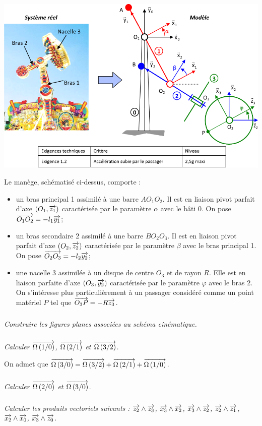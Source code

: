 \documentclass[10pt,oneside]{article}
\begin{document}
\begin{center}
\includegraphics[width=.9\textwidth]{png/img1}
\end{center}

Le manège, schématisé ci-dessus, comporte :
\begin{itemize}
\item un bras principal 1 assimilé à une barre $AO_1O_2$. Il est en liaison pivot parfait d'axe $(O_1,\overrightarrow{z_1})$ caractérisée par le paramètre $\alpha$ avec le bâti 0. On pose $\overrightarrow{O_1O_2}=-l_1\overrightarrow{y_1}$;
\item un bras secondaire 2 assimilé à une barre $BO_2O_3$. Il est en liaison pivot parfait d'axe $(O_2,\overrightarrow{z_2})$ caractérisée par le paramètre $\beta$ avec le bras principal 1. On pose $\overrightarrow{O_2O_3}=-l_2\overrightarrow{y_2}$;
\item une nacelle 3 assimilée à un disque de centre $O_3$ et de rayon $R$. Elle est en liaison parfaite d'axe $(O_3,\overrightarrow{y_2})$ caractérisée par le paramètre $\varphi$ avec le bras 2. On s'intéresse plus particulièrement à un passager considéré comme un point matériel $P$ tel que $\overrightarrow{O_3P}=-R\overrightarrow{z_3}$.
\end{itemize}
\subparagraph{}
\textit{Construire les figures planes associées au schéma cinématique.}

\subparagraph{}
\textit{Calculer $\overrightarrow{\Omega\left( {1}/{0}\right)}$, $\overrightarrow{\Omega\left( {2}/{1}\right)}$ et $\overrightarrow{\Omega\left( {3}/{2}\right)}$.}

\vspace{.3cm}

On admet que $\overrightarrow{\Omega\left( {3}/{0}\right)}=\overrightarrow{\Omega\left( {3}/{2}\right)}+\overrightarrow{\Omega\left( {2}/{1}\right)}+\overrightarrow{\Omega\left( {1}/{0}\right)}$.

\subparagraph{}
\textit{Calculer $\overrightarrow{\Omega\left( {2}/{0}\right)}$ et $\overrightarrow{\Omega\left( {3}/{0}\right)}$.}

\subparagraph{}
\textit{Calculer les produits vectoriels suivants : $\overrightarrow{z_2}\wedge\overrightarrow{z_3}$,
$\overrightarrow{x_3}\wedge\overrightarrow{x_2}$, $\overrightarrow{x_3}\wedge\overrightarrow{z_2}$,
$\overrightarrow{z_2}\wedge\overrightarrow{z_1}$, $\overrightarrow{x_2}\wedge\overrightarrow{x_0}$,
$\overrightarrow{x_3}\wedge\overrightarrow{z_0}$.}
\end{document}
